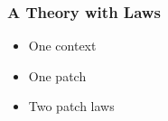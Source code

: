 \begin{frame}[fragile]
\frametitle{A Theory with Laws}
\begin{itemize}
\item One context
\item One patch
\item Two patch laws
\end{itemize}
\begin{code}%
\>[0]\AgdaSpace{}%
\AgdaSpace{}%
\AgdaSymbol{:}\AgdaSpace{}%
\AgdaSpace{}%
\<%
\\
\>[0][@{}l@{\AgdaIndent{0}}]%
\>[2]\AgdaSpace{}%
\AgdaSymbol{:}\AgdaSpace{}%
\<%
\\
%
\>[2]\AgdaSpace{}%
\AgdaSymbol{:}\AgdaSpace{}%
\AgdaSpace{}%
\AgdaSpace{}%
\AgdaSpace{}%
\AgdaSpace{}%
\AgdaSpace{}%
\AgdaSpace{}%
\AgdaSpace{}%
\AgdaSpace{}%
\AgdaSpace{}%
\<%
\\
%
\>[2]\AgdaSpace{}%
\AgdaSymbol{:}\AgdaSpace{}%
\AgdaSpace{}%
\AgdaSpace{}%
\AgdaSpace{}%
\AgdaSpace{}%
\AgdaSpace{}%
\AgdaSpace{}%
\AgdaSpace{}%
\AgdaSpace{}%
\AgdaSpace{}%
\AgdaSpace{}%
\<%
\\
%
\>[2]\AgdaSpace{}%
\AgdaSymbol{:}\AgdaSpace{}%
\AgdaSpace{}%
\AgdaSpace{}%
\AgdaSpace{}%
\AgdaSpace{}%
\AgdaSpace{}%
\AgdaSpace{}%
\AgdaSpace{}%
\AgdaSpace{}%
\AgdaSpace{}%
\AgdaSpace{}%
\AgdaSpace{}%
\<%
\\
\>[2][@{}l@{\AgdaIndent{0}}]%
\>[4]\AgdaSymbol{(}\AgdaSpace{}%
\AgdaSpace{}%
\AgdaSpace{}%
\AgdaSpace{}%
\AgdaSymbol{)}\AgdaSpace{}%
\AgdaSpace{}%
\AgdaSymbol{(}\AgdaSpace{}%

\end{code}
\end{frame}
